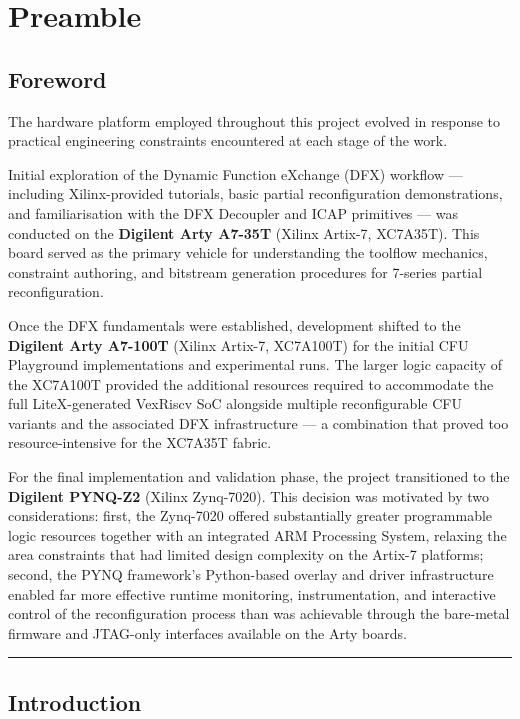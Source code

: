 \chapter{Preamble}

\section*{Foreword}

The hardware platform employed throughout this project evolved in response to practical engineering constraints encountered at each stage of the work.

Initial exploration of the Dynamic Function eXchange (DFX) workflow — including Xilinx-provided tutorials, basic partial reconfiguration demonstrations, and familiarisation with the DFX Decoupler and ICAP primitives — was conducted on the \textbf{Digilent Arty A7-35T} (Xilinx Artix-7, XC7A35T). This board served as the primary vehicle for understanding the toolflow mechanics, constraint authoring, and bitstream generation procedures for 7-series partial reconfiguration.

Once the DFX fundamentals were established, development shifted to the \textbf{Digilent Arty A7-100T} (Xilinx Artix-7, XC7A100T) for the initial CFU Playground implementations and experimental runs. The larger logic capacity of the XC7A100T provided the additional resources required to accommodate the full LiteX-generated VexRiscv SoC alongside multiple reconfigurable CFU variants and the associated DFX infrastructure — a combination that proved too resource-intensive for the XC7A35T fabric.

For the final implementation and validation phase, the project transitioned to the \textbf{Digilent PYNQ-Z2} (Xilinx Zynq-7020). This decision was motivated by two considerations: first, the Zynq-7020 offered substantially greater programmable logic resources together with an integrated ARM Processing System, relaxing the area constraints that had limited design complexity on the Artix-7 platforms; second, the PYNQ framework's Python-based overlay and driver infrastructure enabled far more effective runtime monitoring, instrumentation, and interactive control of the reconfiguration process than was achievable through the bare-metal firmware and JTAG-only interfaces available on the Arty boards.

\vspace{0.4em}\hrule\vspace{0.4em}

\section{Introduction}

